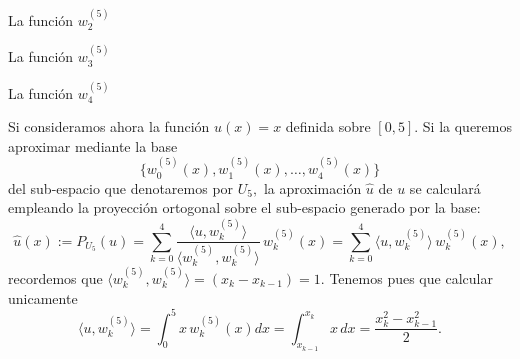 \documentclass[10pt,handout]{beamer}
\theoremstyle{plain} %
\theoremstyle{plain} %
\theoremstyle{plain} %
\theoremstyle{plain} %
\theoremstyle{definition}
\theoremstyle{example}
\theoremstyle{example}
\theoremstyle{remark}
\theoremstyle{remark}
\begin{document}
\begin{frame}{La función $w_2^{(5)}$}
\end{frame}


\begin{frame}{La función $w_3^{(5)}$}
\end{frame}

\begin{frame}{La función $w_4^{(5)}$}
\end{frame}

\begin{frame}
Si consideramos ahora la función $u(x)=x$ definida sobre $[0,5].$ Si la queremos aproximar
mediante la base 
$$
\{w_0^{(5)}(x),w_1^{(5)}(x),\ldots,w_{4}^{(5)}(x)\}
$$
del sub-espacio que denotaremos por $U_5,$ 
la aproximación $\widehat{u}$ de $u$ se calculará empleando la proyección
ortogonal sobre el sub-espacio generado por la base:
$$
\widehat{u}(x) := P_{U_5}(u) = \sum_{k=0}^4 \frac{\langle u,w_k^{(5)} \rangle}
{\langle w_k^{(5)},w_k^{(5)}\rangle}\, w_k^{(5)}(x) = 
\sum_{k=0}^4 \langle u,w_k^{(5)} \rangle \, w_k^{(5)}(x),
$$
recordemos que $\langle w_k^{(5)},w_k^{(5)}\rangle=(x_k-x_{k-1}) = 1.$ Tenemos
pues que calcular unicamente
$$
\langle u,w_k^{(5)} \rangle = \int_0^5 x \,w_k^{(5)}(x) dx = \int_{x_{k-1}}^{x_k} x \,dx = \frac{x_k^2-x_{k-1}^2}{2}. 
$$
\end{frame}
\end{document}

